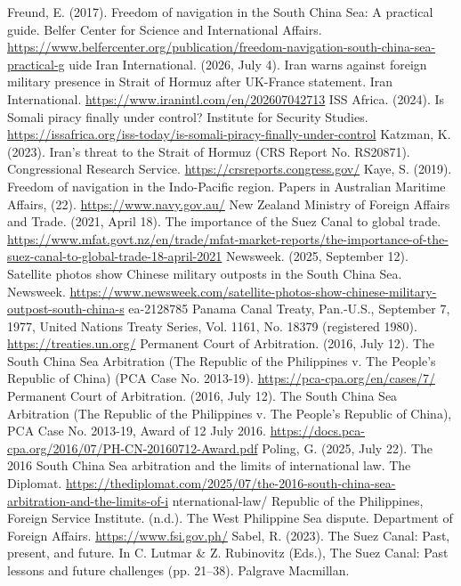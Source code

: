 \begin{referencelist}
   Freund, E. (2017). Freedom of navigation in the South China Sea: A practical guide. Belfer Center for Science and International Affairs. \url{https://www.belfercenter.org/publication/freedom-navigation-south-china-sea-practical-g} uide Iran International. (2026, July 4). Iran warns against foreign military presence in Strait of Hormuz after UK-France statement. Iran International. \url{https://www.iranintl.com/en/202607042713}
   ISS Africa. (2024). Is Somali piracy finally under control? Institute for Security Studies. \url{https://issafrica.org/iss-today/is-somali-piracy-finally-under-control}
   Katzman, K. (2023). Iran's threat to the Strait of Hormuz (CRS Report No. RS20871). Congressional Research Service. \url{https://crsreports.congress.gov/}
   Kaye, S. (2019). Freedom of navigation in the Indo-Pacific region. Papers in Australian Maritime Affairs, (22). \url{https://www.navy.gov.au/}
   New Zealand Ministry of Foreign Affairs and Trade. (2021, April 18). The importance of the Suez Canal to global trade. \url{https://www.mfat.govt.nz/en/trade/mfat-market-reports/the-importance-of-the-suez-canal-to-global-trade-18-april-2021}
   Newsweek. (2025, September 12). Satellite photos show Chinese military outposts in the South China Sea. Newsweek. \url{https://www.newsweek.com/satellite-photos-show-chinese-military-outpost-south-china-s} ea-2128785 Panama Canal Treaty, Pan.-U.S., September 7, 1977, United Nations Treaty Series, Vol. 1161, No. 18379 (registered 1980). \url{https://treaties.un.org/}
   Permanent Court of Arbitration. (2016, July 12). The South China Sea Arbitration (The Republic of the Philippines v. The People's Republic of China) (PCA Case No. 2013-19). \url{https://pca-cpa.org/en/cases/7/}
   Permanent Court of Arbitration. (2016, July 12). The South China Sea Arbitration (The Republic of the Philippines v. The People's Republic of China), PCA Case No. 2013-19, Award of 12 July 2016. \url{https://docs.pca-cpa.org/2016/07/PH-CN-20160712-Award.pdf}
   Poling, G. (2025, July 22). The 2016 South China Sea arbitration and the limits of international law. The Diplomat. \url{https://thediplomat.com/2025/07/the-2016-south-china-sea-arbitration-and-the-limits-of-i} nternational-law/
   Republic of the Philippines, Foreign Service Institute. (n.d.). The West Philippine Sea dispute. Department of Foreign Affairs. \url{https://www.fsi.gov.ph/}
   Sabel, R. (2023). The Suez Canal: Past, present, and future. In C. Lutmar \& Z. Rubinovitz (Eds.), The Suez Canal: Past lessons and future challenges (pp. 21–38). Palgrave Macmillan.

\end{referencelist}
